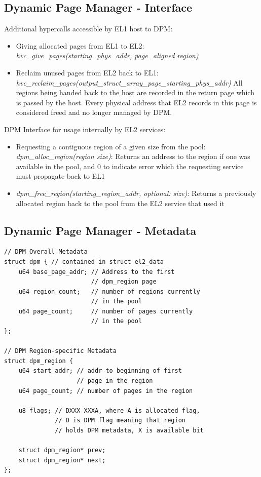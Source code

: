 \subsection{Dynamic Page Manager - Interface}
Additional hypercalls accessible by EL1 host to DPM:

\begin{itemize}
\item Giving allocated pages from EL1 to EL2:
\textit{hvc\_give\_pages(starting\_phys\_addr, page\_aligned region)}
\item Reclaim unused pages from EL2 back to EL1:
\textit{hvc\_reclaim\_pages(output\_struct\_array\_page\_starting\_phys\_addr)}
All regions being handed back to the host are recorded in the return page which is
passed by the host. Every physical address that EL2 records in this page is considered
freed and no longer managed by DPM.
\end{itemize}

DPM Interface for usage internally by EL2 services:
\begin{itemize}
\item Requesting a contiguous region of a given size from the pool:
\textit{dpm\_alloc\_region(region size)}:
	Returns an address to the region if one was available in the pool,
    and 0 to indicate error which the requesting service must propagate back to EL1
\item
\textit{dpm\_free\_region(starting\_region\_addr, optional: size)}:
Returns a previously allocated region back to the pool from the EL2 service that used it
\end{itemize}

\subsection{Dynamic Page Manager - Metadata}
\begin{verbatim}
// DPM Overall Metadata
struct dpm { // contained in struct el2_data
    u64 base_page_addr; // Address to the first
                        // dpm_region page
    u64 region_count;   // number of regions currently
                        // in the pool
    u64 page_count;     // number of pages currently
                        // in the pool
};

// DPM Region-specific Metadata
struct dpm_region {
    u64 start_addr; // addr to beginning of first
                    // page in the region
    u64 page_count; // number of pages in the region

    u8 flags; // DXXX XXXA, where A is allocated flag,
              // D is DPM flag meaning that region
              // holds DPM metadata, X is available bit

    struct dpm_region* prev;
    struct dpm_region* next;
};
\end{verbatim}

